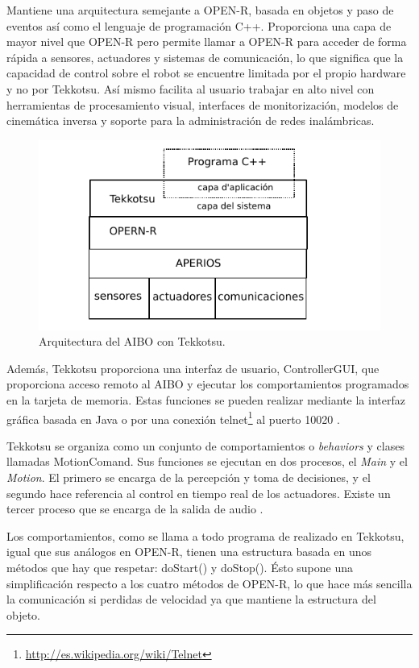 \documentclass[12pt,a4paper,final,twoside]{book}
\begin{document}
Mantiene una arquitectura semejante a OPEN-R, basada en objetos y paso de eventos así como el lenguaje de programación C++. Proporciona una capa de mayor nivel que OPEN-R pero permite llamar a OPEN-R para acceder de forma rápida a sensores, actuadores y sistemas de comunicación, lo que significa que la capacidad de control sobre el robot se encuentre limitada por el propio hardware y no por Tekkotsu. Así mismo facilita al usuario trabajar en alto nivel con herramientas de procesamiento visual, interfaces de monitorización, modelos de cinemática inversa y soporte para la administración de redes inalámbricas.
 
\begin{figure}[h!]
	\centering
    \includegraphics[scale=1.2]{images/tekk.pdf}
	 \caption{Arquitectura del AIBO con Tekkotsu.}
  \label{fig:tekk}
\end{figure}

Además, Tekkotsu proporciona una interfaz de usuario, ControllerGUI, que proporciona acceso remoto al AIBO y ejecutar los comportamientos programados en la tarjeta de memoria. Estas funciones se pueden realizar mediante la interfaz gráfica basada en Java o por una conexión telnet\footnote{\url{http://es.wikipedia.org/wiki/Telnet}} al puerto 10020 \cite{TekkQuickRef}.

Tekkotsu se organiza como un conjunto de comportamientos o \textit{behaviors} y clases llamadas MotionComand. Sus funciones se ejecutan en dos procesos, el \textit{Main} y el \textit{Motion}. El primero se encarga de la percepción y toma de decisiones, y el segundo hace referencia al control en tiempo real de los actuadores. Existe un tercer proceso que se encarga de la salida de audio \cite{tekkTut}. 

Los comportamientos, como se llama a todo programa de realizado en Tekkotsu, igual que sus análogos en OPEN-R, tienen una estructura basada en unos métodos que hay que respetar: doStart() y doStop(). Ésto supone una simplificación respecto a los cuatro métodos de OPEN-R, lo que hace más sencilla la comunicación si perdidas de velocidad ya que mantiene la estructura del objeto.
  
\end{document}
